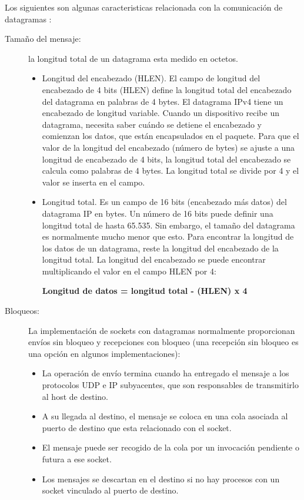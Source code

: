 Los siguientes son algunas caracteristicas relacionada  con la comunicación de datagramas \cite{Forouzan2021}:
\begin{description}
	\item [Tamaño del mensaje:] la longitud total de un datagrama esta medido en octetos.
	\begin{itemize}
		\item Longitud del encabezado (HLEN). El campo de longitud del encabezado de 4 bits (HLEN) define la longitud total del encabezado del datagrama en palabras de 4 bytes. El datagrama IPv4 tiene un encabezado de longitud variable. Cuando un dispositivo recibe un datagrama, necesita saber cuándo se detiene el encabezado y comienzan los datos, que están encapsulados en el paquete. Para que el valor de la longitud del encabezado (número de bytes) se ajuste a una longitud de encabezado de 4 bits, la longitud total del encabezado se calcula como palabras de 4 bytes. La longitud total se divide por 4 y el valor se inserta en el campo.
		\item Longitud total. Es un campo de 16 bits  (encabezado más datos) del datagrama IP en bytes. Un número de 16 bits puede definir una longitud total de hasta 65.535. Sin embargo, el tamaño del datagrama es normalmente mucho menor que esto. Para encontrar la longitud de los datos de un datagrama, reste la longitud del encabezado de la longitud total. La longitud del encabezado se puede encontrar multiplicando el valor en el campo HLEN por 4:
	 	
		  \begin{tcolorbox}
			[colback=green!5!white,colframe=green!75!black,fonttitle=\bfseries]
				\small{\textbf{Longitud de datos = longitud total - (HLEN) x 4}}
		\end{tcolorbox}
		
	\end{itemize}
	
	\item[Bloqueos:]  La implementación de sockets con datagramas  normalmente proporcionan envíos sin bloqueo y recepciones con bloqueo (una recepción sin bloqueo es una opción en algunos implementaciones): 
	\begin{itemize}
		\item La operación de envío termina cuando ha entregado el mensaje a los protocolos UDP e IP subyacentes, que son responsables de transmitirlo al host de destino. 
		\item A su llegada al destino, el mensaje se coloca en una cola asociada al puerto de destino que esta relacionado con el socket. 
		\item El mensaje puede ser recogido de la cola por un invocación pendiente o futura a ese socket. 
		\item Los mensajes se descartan en 	el destino si no hay  procesos  con un socket vinculado al puerto de destino.
	\end{itemize} 
	

\end{description}
